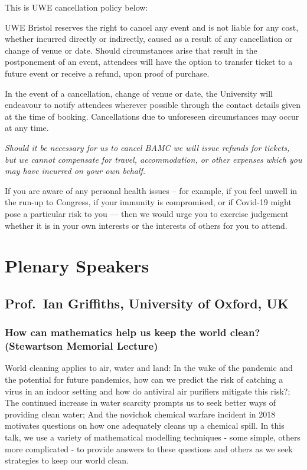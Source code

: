 \documentclass[12pt,a4paper]{article}
\begin{document}
This is UWE cancellation policy below:

UWE Bristol reserves the right to cancel any event and is not liable for any cost, whether incurred directly or indirectly, caused as a result of any cancellation or change of venue or date. Should circumstances arise that result in the postponement of an event, attendees will have the option to transfer ticket to a future event or receive a refund, upon proof of purchase.

In the event of a cancellation, change of venue or date, the University will endeavour to notify attendees wherever possible through the contact details given at the time of booking. Cancellations due to unforeseen
circumstances may occur at any time.

\emph{Should it be necessary for us to cancel BAMC we will issue refunds for tickets, but we cannot compensate for travel, accommodation, or other expenses which you may have incurred on your own behalf.}

If you are aware of any personal health issues -- for example, if you feel unwell in the run-up to Congress, if your immunity is compromised, or if Covid-19 might pose a particular risk to you --- then we would urge you to exercise judgement whether it is in your own interests or the interests of others for you to attend.

\section{Plenary Speakers}

\subsection{Prof.~Ian Griffiths, University of Oxford, UK}

\subsubsection{How can mathematics help us keep the world clean? (Stewartson Memorial Lecture)}

World cleaning applies to air, water and land: In the wake of the pandemic and the potential for future pandemics, how can we predict the risk of catching a virus in an indoor setting and how do antiviral air purifiers mitigate this risk?; The continued increase in water scarcity prompts us to seek better ways of providing clean water; And the novichok chemical warfare incident in 2018 motivates questions on how one adequately cleans up a chemical spill. In this talk, we use a variety of mathematical modelling techniques - some simple, others more complicated - to provide answers to these questions and others as we seek strategies to keep our world clean.
\end{document}
